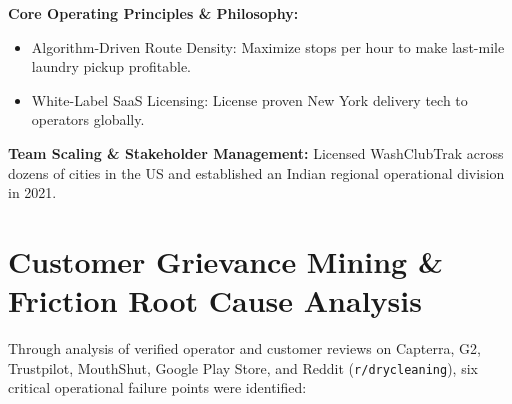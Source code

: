 \documentclass[11pt,a4paper]{article}
\begin{document}
\textbf{Core Operating Principles \& Philosophy:}
\begin{itemize}[leftmargin=*]
    \item Algorithm-Driven Route Density: Maximize stops per hour to make last-mile laundry pickup profitable.
    \item White-Label SaaS Licensing: License proven New York delivery tech to operators globally.
\end{itemize}

\textbf{Team Scaling \& Stakeholder Management:} Licensed WashClubTrak across dozens of cities in the US and established an Indian regional operational division in 2021.

\newpage
\section{Customer Grievance Mining \& Friction Root Cause Analysis}

Through analysis of verified operator and customer reviews on Capterra, G2, Trustpilot, MouthShut, Google Play Store, and Reddit (\texttt{r/drycleaning}), six critical operational failure points were identified:
\end{document}
